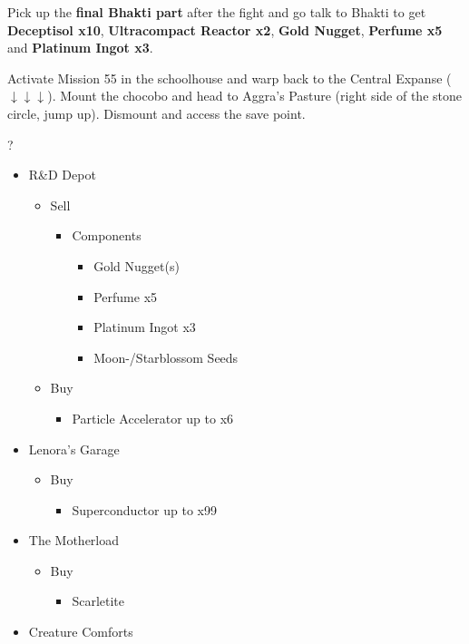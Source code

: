 Pick up the \textbf{final Bhakti part} after the fight and go talk to Bhakti to get \textbf{Deceptisol x10}, \textbf{Ultracompact Reactor x2}, \textbf{Gold Nugget}, \textbf{Perfume x5} and \textbf{Platinum Ingot x3}.

Activate Mission 55 in the schoolhouse and warp back to the Central Expanse ($\downarrow\downarrow\downarrow$).
Mount the chocobo and head to Aggra's Pasture (right side of the stone circle, jump up).
Dismount and access the save point.

\begin{shop}{?}
	\begin{itemize}
		\item R\&D Depot
			\begin{itemize}
				\item Sell
					\begin{itemize}
						\item Components
							\begin{itemize}
								\item Gold Nugget(s)
								\item Perfume x5
								\item Platinum Ingot x3
								\item Moon-/Starblossom Seeds
							\end{itemize}
					\end{itemize}
				\item Buy
					\begin{itemize}
						\item Particle Accelerator up to x6
					\end{itemize}
			\end{itemize}
		\item Lenora's Garage
			\begin{itemize}
				\item Buy
					\begin{itemize}
						\item Superconductor up to x99
					\end{itemize}
			\end{itemize}
		\item The Motherload
			\begin{itemize}
				\item Buy
					\begin{itemize}
						\item Scarletite
					\end{itemize}
			\end{itemize}
		\item Creature Comforts

\end{itemize}
\end{shop}
